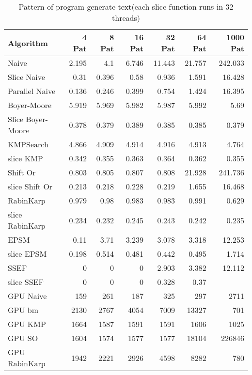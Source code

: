 \documentclass[11pt]{article}       %
\begin{document}
\begin{table}[htbp]
  \centering
  \caption{Pattern of program generate text(each slice function runs in 32 threads)}
    \begin{tabular}{lrrrrrr}\label{t3}
Algorithm & 4 Pat & 8 Pat & 16 Pat & 32 Pat & 64 Pat & 1000 Pat \\
 \hline
    Naive & 2.195 & 4.1   & 6.746 & 11.443 & 21.757 & 242.033 \\
    Slice Naive & 0.31  & 0.396 & 0.58  & 0.936 & 1.591 & 16.428 \\
    Parallel Naive & 0.136 & 0.246 & 0.399 & 0.754 & 1.424 & 16.395 \\
    {Boyer-Moore} & 5.919 & 5.969 & 5.982 & 5.987 & 5.992 & 5.69 \\
    Slice Boyer-Moore & 0.378 & 0.379 & 0.389 & 0.385 & 0.385 & 0.379 \\
    KMPSearch & 4.866 & 4.909 & 4.914 & 4.916 & 4.913 & 4.764 \\
    slice KMP & 0.342 & 0.355 & 0.363 & 0.364 & 0.362 & 0.355 \\
    Shift Or & 0.803 & 0.805 & 0.807 & 0.808 & 21.928 & 241.736 \\
    slice Shift Or & 0.213 & 0.218 & 0.228 & 0.219 & 1.655 & 16.468 \\
    RabinKarp & 0.979 & 0.98  & 0.983 & 0.983 & 0.991 & 0.629 \\
    slice RabinKarp & 0.234 & 0.232 & 0.245 & 0.243 & 0.242 & 0.235 \\
    EPSM  & 0.11  & 3.71  & 3.239 & 3.078 & 3.318 & 12.253 \\
    slice EPSM & 0.198 & 0.514 & 0.481 & 0.442 & 0.495 & 1.714 \\
    SSEF  & 0     & 0     & 0     & 2.903 & 3.382 & 12.112 \\
    slice SSEF & 0 & 0 & 0 & 0.328 & 0.37  &  \\
    GPU Naive & 159   & 261   & 187   & 325   & 297   & 2711 \\
    GPU bm & 2130  & 2767  & 4054  & 7009  & 13327 & 701 \\
    GPU KMP & 1664  & 1587  & 1591  & 1591  & 1606  & 1025 \\
    GPU SO & 1604  & 1574  & 1577  & 1577  & 18104 & 226846 \\
    GPU RabinKarp & 1942  & 2221  & 2926  & 4598  & 8282  & 780 \\

    \end{tabular}%
  \label{tab:addlabel}%
\end{table}%
\end{document}
